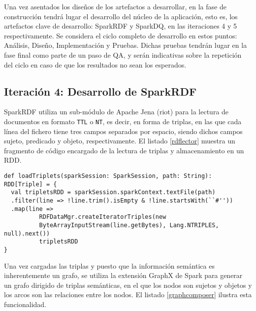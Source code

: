 Una vez asentados los diseños de los artefactos a desarrollar, en la fase de
construcción tendrá lugar el desarrollo del núcleo de la aplicación, esto es,
los artefactos clave de desarrollo: SparkRDF y SparkDQ, en las iteraciones 4 y 5
respectivamente. Se considera el ciclo completo de desarrollo en estos puntos:
Análisis, Diseño, Implementación y Pruebas. Dichas pruebas tendrán lugar en la
fase final como parte de un paso de \acf{QA}, y serán indicativas sobre la
repetición del ciclo en caso de que los resultados no sean los esperados. 

\subsection{Iteración 4: Desarrollo de SparkRDF}
\label{iteracion4}


SparkRDF utiliza un sub-módulo de Apache Jena (riot) para la lectura de
documentos en formato \texttt{TTL} o \texttt{NT}, es decir, en forma de triplas, en las que cada línea
del fichero tiene tres campos separados por espacio, siendo dichos campos sujeto,
predicado y objeto, respectivamente. El listado \ref{rdflector} muestra un
fragmento de código encargado de la lectura de triplas y almacenamiento en un
RDD. 

\lstset{escapechar=@,language=scala}
\begin{lstlisting}[caption={Fragmento del lector de triplas},captionpos=b, label=rdflector]
def loadTriplets(sparkSession: SparkSession, path: String): RDD[Triple] = {
  val tripletsRDD = sparkSession.sparkContext.textFile(path)
  .filter(line => !line.trim().isEmpty & !line.startsWith(``#''))
  .map(line =>
          RDFDataMgr.createIteratorTriples(new
          ByteArrayInputStream(line.getBytes), Lang.NTRIPLES, null).next())
          tripletsRDD
}  
\end{lstlisting}

Una vez cargadas las triplas y puesto que la información semántica es
inherentemente un grafo, se utiliza la extensión GraphX de Spark para generar un
grafo dirigido de triplas semánticas, en el que los nodos son sujetos y objetos y los
arcos son las relaciones entre los nodos. El listado \ref{graphcomposer} ilustra
esta funcionalidad. 


